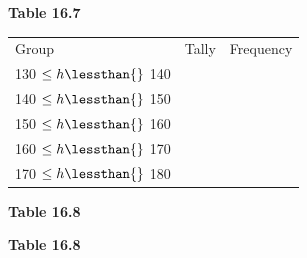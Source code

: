 \begin{description}[noitemsep]
\begin{description}[noitemsep]
\begin{enumerate}[noitemsep, label=\textbf{\arabic*}. ]
\begin{table}[H]
    \begin{caption}{\small\bfseries Table 16.7}\end{caption}
\end{table}
    \par
          \begin{table}[H]
        \begin{center}
      \label{m39403*id207774}
    \noindent
      \tablelasttail{}
      \begin{xtabular}[t]{|l|l|l|}\hline
        Group &
        Tally &
        Frequency%
     \tabularnewline{}
        130 $\le h\lessthan{}$ 140 &
         &
     \tabularnewline{}
        140 $\le h\lessthan{}$ 150 &
         &
     \tabularnewline{}
        150 $\le h\lessthan{}$ 160 &
         &
     \tabularnewline{}
        160 $\le h\lessthan{}$ 170 &
         &
     \tabularnewline{}
        170 $\le h\lessthan{}$ 180 &
         &
     \tabularnewline{}
    \end{xtabular}
      \end{center}
    \begin{center}{\small\bfseries Table 16.8}\end{center}
    \begin{caption}{\small\bfseries Table 16.8}\end{caption}
\end{table}

\end{enumerate}
\end{description}
\end{description}
